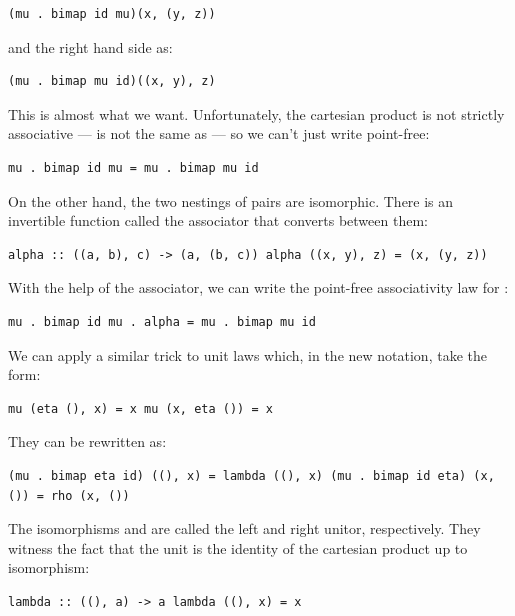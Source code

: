\begin{verbatim}
(mu . bimap id mu)(x, (y, z))
\end{verbatim}

and the right hand side as:

\begin{verbatim}
(mu . bimap mu id)((x, y), z)
\end{verbatim}

This is almost what we want. Unfortunately, the cartesian product is not
strictly associative ---  is not the same as
 --- so we can't just write point-free:

\begin{verbatim}
mu . bimap id mu = mu . bimap mu id
\end{verbatim}

On the other hand, the two nestings of pairs are isomorphic. There is an
invertible function called the associator that converts between them:

\begin{verbatim}
alpha :: ((a, b), c) -> (a, (b, c)) alpha ((x, y), z) = (x, (y, z))
\end{verbatim}

With the help of the associator, we can write the point-free
associativity law for :

\begin{verbatim}
mu . bimap id mu . alpha = mu . bimap mu id
\end{verbatim}

We can apply a similar trick to unit laws which, in the new notation,
take the form:

\begin{verbatim}
mu (eta (), x) = x mu (x, eta ()) = x
\end{verbatim}

They can be rewritten as:

\begin{verbatim}
(mu . bimap eta id) ((), x) = lambda ((), x) (mu . bimap id eta) (x, ()) = rho (x, ())
\end{verbatim}

The isomorphisms  and  are called the left
and right unitor, respectively. They witness the fact that the unit
\code{()} is the identity of the cartesian product up to isomorphism:

\begin{verbatim}
lambda :: ((), a) -> a lambda ((), x) = x
\end{verbatim}

